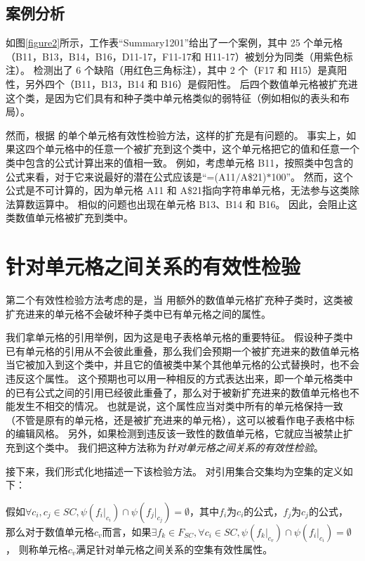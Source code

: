 \subsection*{案例分析}
如图\ref{figure2}所示，工作表“Summary1201”给出了一个案例，其中 25 个单元格（B11，B13，B14，B16，D11-17，F11-17和 H11-17）被\cu 划分为同类（用紫色标注）。
\cu 检测出了 6 个缺陷（用红色三角标注），其中 2 个（F17 和 H15）是真阳性，另外四个（B11，B13，B14 和 B16）是假阳性。
后四个数值单元格被扩充进这个类，是因为它们具有和种子类中单元格类似的弱特征（例如相似的表头和布局）。

然而，根据 \wa 的单个单元格有效性检验方法，这样的扩充是有问题的。
事实上，如果这四个单元格中的任意一个被扩充到这个类中，这个单元格把它的值和任意一个类中包含的公式计算出来的值相一致。
例如，考虑单元格 B11，按照类中包含的公式来看，对于它来说最好的潜在公式应该是“=(A11$/$A\$21)$*$100”。
然而，这个公式是不可计算的，因为单元格 A11 和 A\$21指向字符串单元格，无法参与这类除法算数运算中。
相似的问题也出现在单元格 B13、B14 和 B16。 
因此，\wa 会阻止这类数值单元格被扩充到类中。


\section{针对单元格之间关系的有效性检验}
第二个有效性检验方法考虑的是，当 \wa 用额外的数值单元格扩充种子类时，这类被扩充进来的单元格不会破坏种子类中已有单元格之间的属性。

我们拿单元格的引用举例，因为这是电子表格单元格的重要特征。
假设种子类中已有单元格的引用从不会彼此重叠，那么我们会预期一个被扩充进来的数值单元格当它被加入到这个类中，并且它的值被类中某个其他单元格的公式替换时，也不会违反这个属性。
这个预期也可以用一种相反的方式表达出来，即一个单元格类中的已有公式之间的引用已经彼此重叠了，那么对于被新扩充进来的数值单元格也不能发生不相交的情况。
也就是说，这个属性应当对类中所有的单元格保持一致（不管是原有的单元格，还是被扩充进来的单元格），这可以被看作电子表格中标的编辑风格。
另外，如果检测到违反该一致性的数值单元格，它就应当被禁止扩充到这个类中。
我们把这种方法称为\textit{针对单元格之间关系的有效性检验}。

接下来，我们形式化地描述一下该检验方法。
对引用集合交集均为空集的定义如下：
\begin{definition}
    假如$\forall c_i,c_j \in SC,\psi(f_i|_{c_i}) \cap \psi(f_j|_{c_j}) = \emptyset$，其中$f_i$为$c_i$的公式，$f_j$为$c_j$的公式，
    那么对于数值单元格$c_v$而言，如果$\exists f_k \in F_{SC}, \forall c_i \in SC, \psi(f_k|_{c_v}) \cap \psi(f_i|_{c_i}) = \emptyset$，
    则称单元格$c_v$满足针对单元格之间关系的空集有效性属性。
\end{definition}

